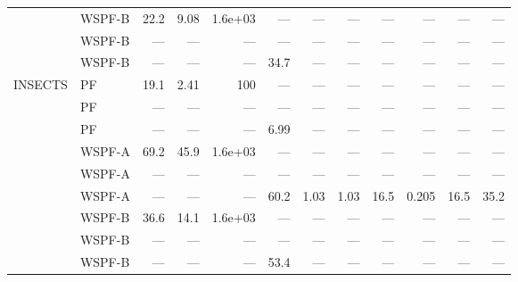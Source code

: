 {\begin{longtable}{@{}llrrrrrrrrrr@{}}
 & WSPF-B & 22.2 & 9.08 & 1.6e+03 & --- & --- & --- & --- & --- & --- & --- \\
 & WSPF-B & --- & --- & --- & --- & --- & --- & --- & --- & --- & --- \\
 & WSPF-B & --- & --- & --- & 34.7 & --- & --- & --- & --- & --- & --- \\
\midrule
INSECTS & PF & 19.1 & 2.41 & 100 & --- & --- & --- & --- & --- & --- & --- \\
 & PF & --- & --- & --- & --- & --- & --- & --- & --- & --- & --- \\
 & PF & --- & --- & --- & 6.99 & --- & --- & --- & --- & --- & --- \\
 & WSPF-A & 69.2 & 45.9 & 1.6e+03 & --- & --- & --- & --- & --- & --- & --- \\
 & WSPF-A & --- & --- & --- & --- & --- & --- & --- & --- & --- & --- \\
 & WSPF-A & --- & --- & --- & 60.2 & 1.03 & 1.03 & 16.5 & 0.205 & 16.5 & 35.2 \\
 & WSPF-B & 36.6 & 14.1 & 1.6e+03 & --- & --- & --- & --- & --- & --- & --- \\
 & WSPF-B & --- & --- & --- & --- & --- & --- & --- & --- & --- & --- \\
 & WSPF-B & --- & --- & --- & 53.4 & --- & --- & --- & --- & --- & --- \\
\end{longtable}
}
